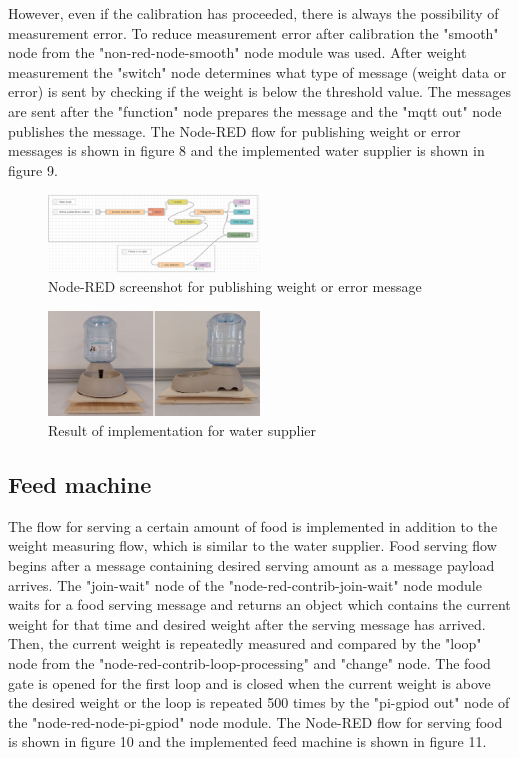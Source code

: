﻿\documentclass[conference]{IEEEtran}
\begin{document}
However, even if the calibration has proceeded, there is always the possibility of measurement error.
To reduce measurement error after calibration the "smooth" node from the "non-red-node-smooth" node module was used.
After weight measurement the "switch" node determines what type of message (weight data or error) is sent by checking if the weight is below the threshold value.
The messages are sent after the "function" node prepares the message and the "mqtt out" node publishes the message.
The Node-RED flow for publishing weight or error messages is shown in figure 8 and the implemented water supplier is shown in figure 9.


\begin{figure}[htbp]
\centerline{\includegraphics[width=0.5\textwidth]{./images/Water Supplier Error Detection.png}}
\caption{Node-RED screenshot for publishing weight or error message}
\label{fig}
\end{figure}

\begin{figure}[htbp]
\centerline{\includegraphics[width=0.5\textwidth]{./images/water-supplier.jpg}}
\caption{Result of implementation for water supplier}
\label{fig}
\end{figure}

\subsection{Feed machine}
The flow for serving a certain amount of food is implemented in addition to the weight measuring flow, which is similar to the water supplier.
Food serving flow begins after a message containing desired serving amount as a message payload arrives.
The "join-wait" node of the "node-red-contrib-join-wait" node module waits for a food serving message and returns an object which contains the current weight for that time and desired weight after the serving message has arrived.
Then, the current weight is repeatedly measured and compared by the "loop" node from the "node-red-contrib-loop-processing" and "change" node.
The food gate is opened for the first loop and is closed when the current weight is above the desired weight or the loop is repeated 500 times by the "pi-gpiod out" node of the "node-red-node-pi-gpiod" node module.
The Node-RED flow for serving food is shown in figure 10 and the implemented feed machine is shown in figure 11.
\end{document}
